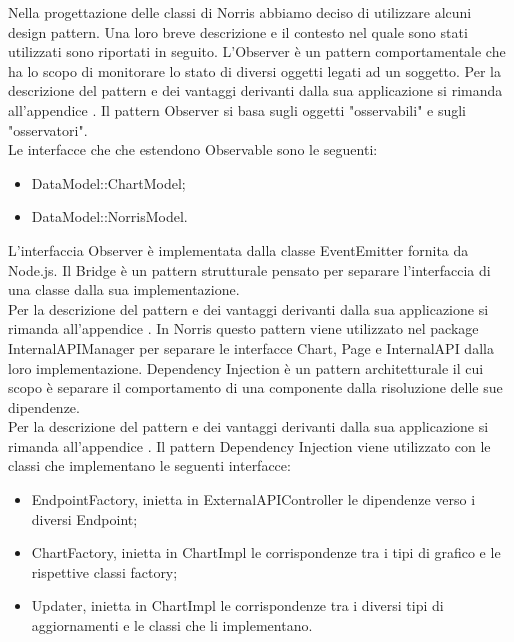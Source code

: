 			Nella progettazione delle classi di Norris abbiamo deciso di utilizzare alcuni design pattern. Una loro breve descrizione e il contesto nel quale sono stati utilizzati sono riportati in seguito.
				L'Observer è un pattern comportamentale che ha lo scopo di monitorare lo stato di diversi oggetti legati ad un soggetto.
				Per la descrizione del pattern e dei vantaggi derivanti dalla sua applicazione si rimanda all'appendice .
					Il pattern Observer si basa sugli oggetti "osservabili" e sugli "osservatori".\\
					Le interfacce che che estendono Observable sono le seguenti:
					\begin{itemize}
						\item DataModel::ChartModel;
						\item DataModel::NorrisModel.
					\end{itemize}
					L'interfaccia Observer è implementata dalla classe EventEmitter fornita da Node.js.
				Il Bridge è un pattern strutturale pensato per separare l'interfaccia di una classe dalla sua implementazione.\\
				Per la descrizione del pattern e dei vantaggi derivanti dalla sua applicazione si rimanda all'appendice .
					In Norris questo pattern viene utilizzato nel package InternalAPIManager per separare le interfacce Chart, Page e InternalAPI dalla loro implementazione.
				Dependency Injection è un pattern architetturale il cui scopo è separare il comportamento di una componente dalla risoluzione delle sue dipendenze.\\
				Per la descrizione del pattern e dei vantaggi derivanti dalla sua applicazione si rimanda all'appendice .
					Il pattern Dependency Injection viene utilizzato con le classi che implementano le seguenti interfacce:
					\begin{itemize}
						\item EndpointFactory, inietta in ExternalAPIController le dipendenze verso i diversi Endpoint;
						\item ChartFactory, inietta in ChartImpl le  corrispondenze tra i tipi di grafico e le rispettive classi factory;
						\item Updater, inietta in ChartImpl le corrispondenze tra i diversi tipi di aggiornamenti e le classi che li implementano.
					\end{itemize}

